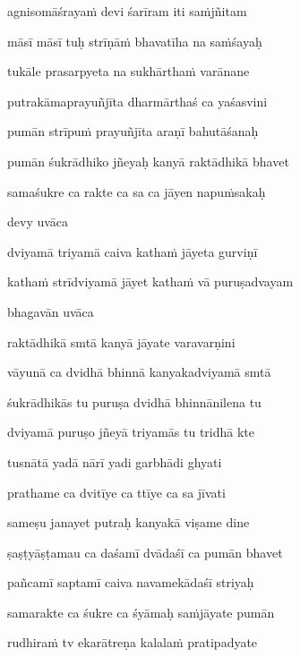 agnisomāśraya\.m devi śarīram iti sa\.mjñitam \veg\dontdisplaylinenum

māsī māsī tuḥ strīṇā\.m bhavatīha na sa\.mśayaḥ\thinspace{\dandab} \dontdisplaylinenum

tukāle prasarpyeta na sukhārtha\.m varānane \veg\dontdisplaylinenum

putrakāmaprayuñjīta dharmārthaś ca yaśasvini\thinspace{\dandab} \dontdisplaylinenum

pumān strīpu\.m prayuñjīta araṇī bahutāśanaḥ \veg\dontdisplaylinenum

pumān śukrādhiko jñeyaḥ kanyā raktādhikā bhavet\thinspace{\dandab} \dontdisplaylinenum

samaśukre ca rakte ca sa ca jāyen napu\.msakaḥ \veg\dontdisplaylinenum


devy uvāca~{\dandab}\dontdisplaylinenum 

dviyamā triyamā caiva katha\.m jāyeta gurviṇī\thinspace{\danda} \dontdisplaylinenum

katha\.m strīdviyamā jāyet katha\.m vā puruṣadvayam \veg\dontdisplaylinenum

bhagavān uvāca~{\dandab}\dontdisplaylinenum 

raktādhikā smtā kanyā jāyate varavarṇini\thinspace{\danda} \dontdisplaylinenum

vāyunā ca dvidhā bhinnā kanyakadviyamā smtā \veg\dontdisplaylinenum

śukrādhikās tu puruṣa dvidhā bhinnānilena tu\thinspace{\dandab} \dontdisplaylinenum

dviyamā puruṣo jñeyā triyamās tu tridhā kte \veg\dontdisplaylinenum

tusnātā yadā nārī yadi garbhādi ghyati\thinspace{\dandab} \dontdisplaylinenum

prathame ca dvitīye ca ttīye ca sa jīvati \veg\dontdisplaylinenum

sameṣu janayet putraḥ kanyakā viṣame dine\thinspace{\dandab} \dontdisplaylinenum

ṣaṣṭyāṣṭamau ca daśamī dvādaśī ca pumān bhavet \veg\dontdisplaylinenum

pañcamī saptamī caiva navamekādaśī striyaḥ\thinspace{\dandab} \dontdisplaylinenum

samarakte ca śukre ca śyāmaḥ sa\.mjāyate pumān \veg\dontdisplaylinenum

rudhira\.m tv ekarātreṇa kalala\.m pratipadyate\thinspace{\dandab} \dontdisplaylinenum


